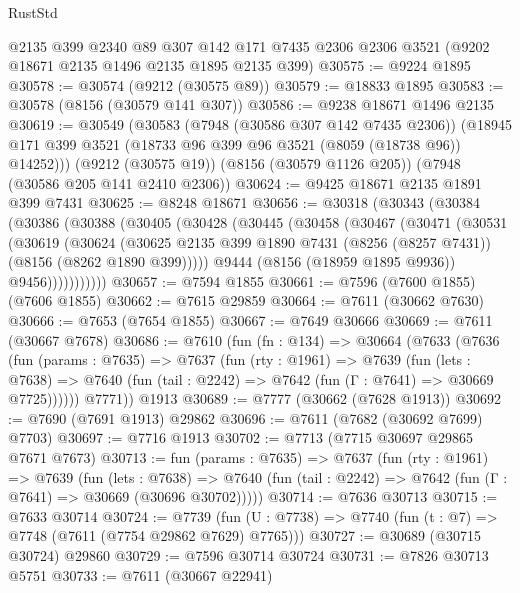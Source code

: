 \begin{lexlean}{RustStd}
\begin{coremodule}
{\begin{coremodule}
{{{{{{{{{{{{{{{{{{{{{{{{{{{{{{{{{{    @2135
    @399
    @2340
    @89
    @307
    @142
    @171
    @7435
    @2306
    @2306
    @3521
    (@9202 @18671 @2135 @1496 @2135 @1895 @2135 @399)
@30575 := @9224 @1895
@30578 := @30574 (@9212 (@30575 @89))
@30579 := @18833 @1895
@30583 := @30578 (@8156 (@30579 @141 @307))
@30586 := @9238 @18671 @1496 @2135
@30619 := @30549
    (@30583
      (@7948 (@30586 @307 @142 @7435 @2306))
      (@18945 @171 @399 @3521 (@18733 @96 @399 @96 @3521 (@8059 (@18738 @96)) @14252)))
    (@9212 (@30575 @19))
    (@8156 (@30579 @1126 @205))
    (@7948 (@30586 @205 @141 @2410 @2306))
@30624 := @9425 @18671 @2135 @1891 @399 @7431
@30625 := @8248 @18671
@30656 := @30318
    (@30343
      (@30384
        (@30386
          (@30388
            (@30405
              (@30428
                (@30445
                  (@30458
                    (@30467
                      (@30471
                        (@30531
                          (@30619
                            (@30624
                              (@30625
                                @2135
                                @399
                                @1890
                                @7431
                                (@8256 (@8257 @7431))
                                (@8156 (@8262 @1890 @399)))))
                          @9444
                          (@8156 (@18959 @1895 @9936))
                          @9456)))))))))))
@30657 := @7594 @1855
@30661 := @7596 (@7600 @1855) (@7606 @1855)
@30662 := @7615 @29859
@30664 := @7611 (@30662 @7630)
@30666 := @7653 (@7654 @1855)
@30667 := @7649 @30666
@30669 := @7611 (@30667 @7678)
@30686 := @7610
    (fun (fn : @134) =>
    @30664
      (@7633
        (@7636
          (fun (params : @7635) =>
          @7637
            (fun (rty : @1961) =>
            @7639
              (fun (lets : @7638) =>
              @7640 (fun (tail : @2242) => @7642 (fun (Γ : @7641) => @30669 @7725))))))
        @7771))
    @1913
@30689 := @7777 (@30662 (@7628 @1913))
@30692 := @7690 (@7691 @1913) @29862
@30696 := @7611 (@7682 (@30692 @7699) @7703)
@30697 := @7716 @1913
@30702 := @7713 (@7715 @30697 @29865 @7671 @7673)
@30713 := fun (params : @7635) =>
  @7637
    (fun (rty : @1961) =>
    @7639
      (fun (lets : @7638) =>
      @7640 (fun (tail : @2242) => @7642 (fun (Γ : @7641) => @30669 (@30696 @30702)))))
@30714 := @7636 @30713
@30715 := @7633 @30714
@30724 := @7739
    (fun (U : @7738) => @7740 (fun (t : @7) => @7748 (@7611 (@7754 @29862 @7629) @7765)))
@30727 := @30689 (@30715 @30724) @29860
@30729 := @7596 @30714 @30724
@30731 := @7826 @30713 @5751
@30733 := @7611 (@30667 @22941)
}}}}}}}}}}}}}}}}}}}}}}}}}}}}}}}}}}
\end{coremodule}}
\end{coremodule}
\end{lexlean}

